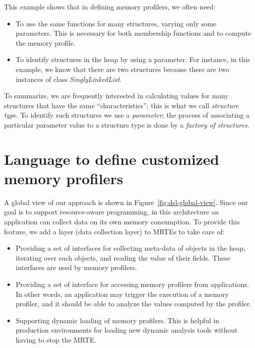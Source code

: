 This example shows that in defining memory profilers, we often need:

\begin{itemize}
\item To use the same functions for many structures, varying only some parameters. This is necessary for both membership functions and to compute the memory profile.

\item To identify structures in the heap by using a parameter. For instance, in this example, we know that there are two structures because there are two instances of class \textit{SinglyLinkedList}.
\end{itemize}

To summarize, we are frequently interested in calculating values for many structures that have the same ``characteristics''; this is what we call \textit{structure type}.
To identify such structures we use a \textit{parameter}; the process of associating a particular parameter value to a structure type is done by a \textit{factory of structures}. 

\section{Language to define customized memory profilers}\label{sec:approach}

A global view of our approach is shown in Figure~\ref{fig:dsl-global-view}.
Since our goal is to support resource-aware programming, in this architecture an application can collect data on its own memory consumption.
To provide this feature, we add a layer (data collection layer) to MRTEs to take care of: 

\begin{itemize}
\item Providing a set of interfaces for collecting meta-data of objects in the heap, iterating over such objects, and reading the value of their fields.
These interfaces are used by memory profilers.

\item Providing a set of interface for accessing memory profilers from applications.
In other words, an application may trigger the execution of a memory profiler, and it should be able to analyze the values computed by the profiler.

\item Supporting dynamic loading of memory profilers.
This is helpful in production environments for loading new dynamic analysis tools without having to stop the MRTE.
\end{itemize}

